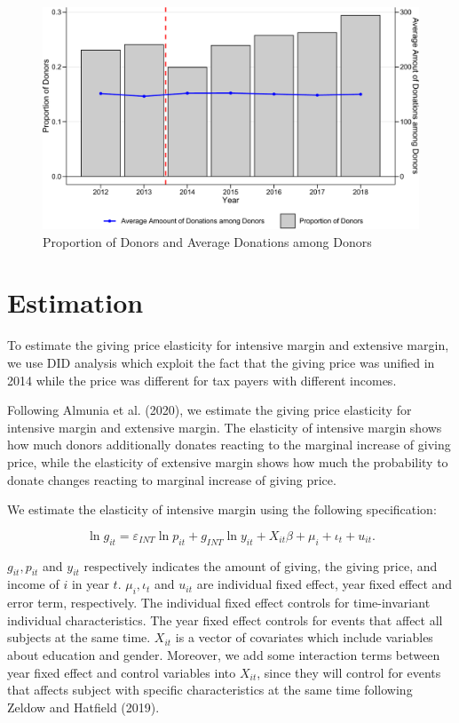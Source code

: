\documentclass[ review  , 3p ]{elsarticle}
\begin{document}
  \begin{figure}[t]

  {\centering \includegraphics[width=0.9\linewidth]{draft_files/figure-latex/SummaryOutcome-1} 

  }

  \caption{Proportion of Donors and Average Donations among Donors}\label{fig:SummaryOutcome}
  \end{figure}

  \hypertarget{estimation}{%
  \section{Estimation}\label{estimation}}

  To estimate the giving price elasticity for intensive margin and extensive margin, we use DID analysis which exploit the fact that the giving price was unified in 2014 while the price was different for tax payers with different incomes.

  Following Almunia et al. (2020), we estimate the giving price elasticity for intensive margin and extensive margin. The elasticity of intensive margin shows how much donors additionally donates reacting to the marginal increase of giving price, while the elasticity of extensive margin shows how much the probability to donate changes reacting to marginal increase of giving price.

  We estimate the elasticity of intensive margin using the following specification:

  \begin{equation}
      \ln g_{it} = \varepsilon_{INT} \ln p_{it} +g_{INT} \ln y_{it} + X_{it}\beta +\mu_i +\iota_t +u_{it}. \label{eq:intensive}
  \end{equation}

  \(g_{it}, p_{it}\) and \(y_{it}\) respectively indicates the amount of giving, the giving price, and income of \(i\) in year \(t\). \(\mu_i, \iota_t\) and \(u_{it}\) are individual fixed effect, year fixed effect and error term, respectively.
  The individual fixed effect controls for time-invariant individual characteristics. The year fixed effect controls for events that affect all subjects at the same time. \(X_{it}\) is a vector of covariates which include variables about education and gender. Moreover, we add some interaction terms between year fixed effect and control variables into \(X_{it}\), since they will control for events that affects subject with specific characteristics at the same time following Zeldow and Hatfield (2019).
\end{document}
